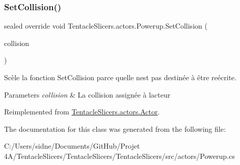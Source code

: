 \subsubsection{\texorpdfstring{Set\+Collision()}{SetCollision()}}
{\footnotesize\ttfamily sealed override void Tentacle\+Slicers.\+actors.\+Powerup.\+Set\+Collision (\begin{DoxyParamCaption}\item[{\hyperlink{class_tentacle_slicers_1_1collisions_1_1_actor_collision}{Actor\+Collision}}]{collision }\end{DoxyParamCaption})\hspace{0.3cm}{\ttfamily [virtual]}}



Scèle la fonction Set\+Collision parce qu\textquotesingle{}elle n\textquotesingle{}est pas destinée à être reécrite. 


\begin{DoxyParams}{Parameters}
{\em collision} & La collision assignée à l\textquotesingle{}acteur \\
\hline
\end{DoxyParams}


Reimplemented from \hyperlink{class_tentacle_slicers_1_1actors_1_1_actor_a6e1eab5bc50ecb03842f49d0dc3b136e}{Tentacle\+Slicers.\+actors.\+Actor}.



The documentation for this class was generated from the following file\+:\begin{DoxyCompactItemize}
\item 
C\+:/\+Users/sidne/\+Documents/\+Git\+Hub/\+Projet 4\+A/\+Tentacle\+Slicers/\+Tentacle\+Slicers/\+Tentacle\+Slicers/src/actors/Powerup.\+cs\end{DoxyCompactItemize}

